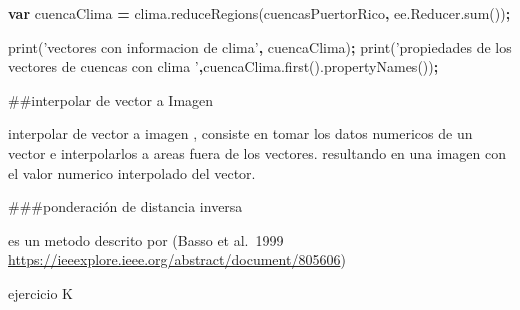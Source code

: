 \documentclass[
]{article}
\newenvironment{Shaded}{\begin{snugshade}}{\end{snugshade}}
\newcommand{\AttributeTok}[1]{\textcolor[rgb]{0.77,0.63,0.00}{#1}}
\newcommand{\KeywordTok}[1]{\textcolor[rgb]{0.13,0.29,0.53}{\textbf{#1}}}
\newcommand{\NormalTok}[1]{#1}
\newcommand{\OperatorTok}[1]{\textcolor[rgb]{0.81,0.36,0.00}{\textbf{#1}}}
\newcommand{\StringTok}[1]{\textcolor[rgb]{0.31,0.60,0.02}{#1}}
\newcommand{\VariableTok}[1]{\textcolor[rgb]{0.00,0.00,0.00}{#1}}
\begin{document}
\begin{Shaded}
\begin{Highlighting}[]
\KeywordTok{var}\NormalTok{ cuencaClima }\OperatorTok{=} \VariableTok{clima}\NormalTok{.}\AttributeTok{reduceRegions}\NormalTok{(cuencasPuertorRico}\OperatorTok{,} \VariableTok{ee}\NormalTok{.}\VariableTok{Reducer}\NormalTok{.}\AttributeTok{sum}\NormalTok{())}\OperatorTok{;}

\AttributeTok{print}\NormalTok{(}\StringTok{'vectores con informacion de clima'}\OperatorTok{,}\NormalTok{ cuencaClima)}\OperatorTok{;}
\AttributeTok{print}\NormalTok{(}\StringTok{'propiedades de los vectores de cuencas con clima '}\OperatorTok{,}\VariableTok{cuencaClima}\NormalTok{.}\AttributeTok{first}\NormalTok{().}\AttributeTok{propertyNames}\NormalTok{())}\OperatorTok{;}
\end{Highlighting}
\end{Shaded}

\#\#interpolar de vector a Imagen

interpolar de vector a imagen , consiste en tomar los datos numericos de
un vector e interpolarlos a areas fuera de los vectores. resultando en
una imagen con el valor numerico interpolado del vector.

\#\#\#ponderación de distancia inversa

es un metodo descrito por (Basso et al.~1999
\url{https://ieeexplore.ieee.org/abstract/document/805606})

ejercicio K
\end{document}
